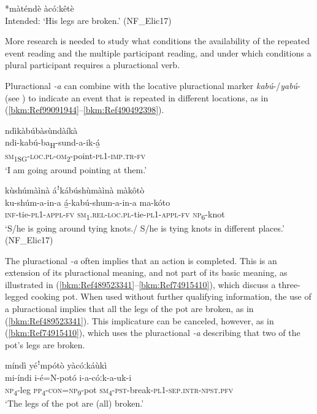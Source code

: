 \ex
  *màténdè àcóːkêtè\\
Intended: ‘His legs are broken.’ (NF\_Elic17)
\z\z

More research is needed to study what conditions the availability of the repeated event reading and the multiple participant reading, and under which conditions a plural participant requires a pluractional verb.

Pluractional \-\textit{-a} can combine with the locative pluractional marker \textit{kabú}-/\textit{yabú}- (see ) to indicate an event that is repeated in different locations, as in (\ref{bkm:Ref99091944}--\ref{bkm:Ref490492398}).

\ea
\label{bkm:Ref99091944}
\glll ndìkàbúbàsùndàíkà\\
ndi-kabú-ba\textsubscript{H}-sund-a-ik-á̲\\
\textsc{sm}\textsubscript{1SG}-\textsc{loc}.\textsc{pl}-\textsc{om}\textsubscript{2}-point-\textsc{pl}1-\textsc{imp}.\textsc{tr}-\textsc{fv}\\
\glt ‘I am going around pointing at them.’
\z

\ea
\label{bkm:Ref490492398}
kùshúmàìnà áꜝkábúshùmàìnà màkôtò\\
\gll ku-shúm-a-in-a    á̲-kabú-shum-a-in-a    ma-kóto\\
\textsc{inf}-tie-\textsc{pl}1-\textsc{appl}-\textsc{fv}  \textsc{sm}\textsubscript{1}.\textsc{rel}-\textsc{loc}.\textsc{pl}-tie-\textsc{pl}1-\textsc{appl}-\textsc{fv}  \textsc{np}\textsubscript{6}-knot\\
\glt ‘S/he is going around tying knots./ S/he is tying knots in different places.’ (NF\_Elic17)
\z

The pluractional \textit{-a} often implies that an action is completed. This is an extension of its pluractional meaning, and not part of its basic meaning, as illustrated in (\ref{bkm:Ref489523341}--\ref{bkm:Ref74915410}), which discuss a three-legged cooking pot. When used without further qualifying information, the use of a pluractional implies that all the legs of the pot are broken, as in (\ref{bkm:Ref489523341}). This implicature can be canceled, however, as in (\ref{bkm:Ref74915410}), which uses the pluractional \textit{-a} describing that two of the pot’s legs are broken.

\ea
\label{bkm:Ref489523341}
míndì yéꜝmpótò yàcóːkáùkì\\
\gll mi-índi  i-é=N-potó    i-a-cóːk-a-uk-i\\
\textsc{np}\textsubscript{4}-leg  \textsc{pp}\textsubscript{4}-\textsc{con}=\textsc{np}\textsubscript{9}-pot  \textsc{sm}\textsubscript{4}-\textsc{pst}-break-\textsc{pl}1-\textsc{sep}.\textsc{intr}-\textsc{npst}.\textsc{pfv}\\
\glt ‘The legs of the pot are (all) broken.’
\z

